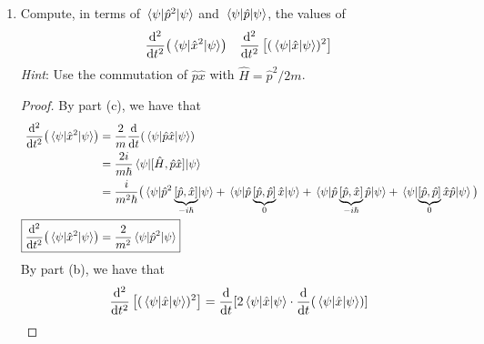\documentclass[../psets.tex]{subfiles}
\begin{document}
\begin{enumerate}
\begin{enumerate}
\begin{proof}
\begin{align*}
                &= \frac{i}{2m\hbar}(\ev{\hat{p}\hat{x}(-i\hbar)}{\psi}+\ev{\hat{p}(-i\hbar)\hat{x}}{\psi}+\ev{\hat{x}(-i\hbar)\hat{p}}{\psi}+\ev{(-i\hbar)\hat{x}\hat{p}}{\psi})\\
                &= \frac{1}{2m}(\ev{\hat{p}\hat{x}}{\psi}+\ev{\hat{p}\hat{x}}{\psi}+\ev{\hat{x}\hat{p}}{\psi}+\ev{\hat{x}\hat{p}}{\psi})\\
                &= \frac{1}{2m}(2\ev{\hat{p}\hat{x}}{\psi}+2\ev{\hat{p}\hat{x}+i\hbar}{\psi})\\
                &= \frac{1}{2m}(4\ev{\hat{p}\hat{x}}{\psi}+2i\hbar\braket{\psi})\\
                &= \frac{2}{m}\ev{\hat{p}\hat{x}}{\psi}+\frac{i\hbar}{m}
            \end{align*}
            as desired.
        \end{proof}
        \item Compute, in terms of $\ev{\hat{p}^2}{\psi}$ and $\ev{\hat{p}}{\psi}$, the values of
        \begin{align}
            \dv[2]{t}(\ev{\hat{x}^2}{\psi})&&
            \dv[2]{t}\left[ (\ev{\hat{x}}{\psi})^2 \right]
        \end{align}
        \emph{Hint}: Use the commutation of $\hat{p}\hat{x}$ with $\hat{H}=\hat{p}^2/2m$.
        \begin{proof}
            By part (c), we have that
            \begin{align*}
                \dv[2]{t}(\ev{\hat{x}^2}{\psi})
                &= \frac{2}{m}\dv{t}(\ev{\hat{p}\hat{x}}{\psi})\\
                &= \frac{2i}{m\hbar}\ev{[\hat{H},\hat{p}\hat{x}]}{\psi}\\
                &= \frac{i}{m^2\hbar}\big( \ev{\hat{p}^2\underbrace{[\hat{p},\hat{x}]}_{-i\hbar}}{\psi}+\ev{\hat{p}\underbrace{[\hat{p},\hat{p}]}_0\hat{x}}{\psi}+\ev{\hat{p}\underbrace{[\hat{p},\hat{x}]}_{-i\hbar}\hat{p}}{\psi}+\ev{\underbrace{[\hat{p},\hat{p}]}_0\hat{x}\hat{p}}{\psi} \big)\\
                \Aboxed{\dv[2]{t}(\ev{\hat{x}^2}{\psi}) &= \frac{2}{m^2}\ev{\hat{p}^2}{\psi}}
            \end{align*}
            By part (b), we have that
            \begin{align*}
                \dv[2]{t}\left[ (\ev{\hat{x}}{\psi})^2 \right] &= \dv{t}[2\ev{\hat{x}}{\psi}\cdot\dv{t}(\ev{\hat{x}}{\psi})]\\

\end{align*}
\end{proof}
\end{enumerate}
\end{enumerate}
\end{document}
